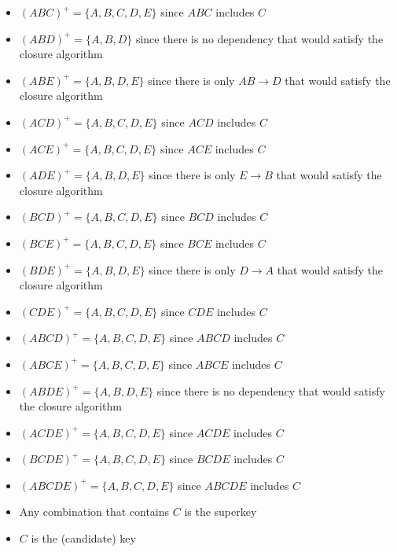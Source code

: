 \documentclass[12pt]{article}
\begin{document}
\begin{enumerate}
\begin{itemize}
          \item $(ABC)^+ = \{A, B, C, D, E\}$ since $ABC$ includes $C$
          \item $(ABD)^+ = \{A, B, D\}$ since there is no dependency that would
                satisfy the closure algorithm
          \item $(ABE)^+ = \{A, B, D, E\}$ since there is only $AB
                \longrightarrow D$ that would satisfy the closure algorithm
          \item $(ACD)^+ = \{A, B, C, D, E\}$ since $ACD$ includes $C$
          \item $(ACE)^+ = \{A, B, C, D, E\}$ since $ACE$ includes $C$
          \item $(ADE)^+ = \{A, B, D, E\}$ since there is only $E
                \longrightarrow B$ that would satisfy the closure algorithm
          \item $(BCD)^+ = \{A, B, C, D, E\}$ since $BCD$ includes $C$
          \item $(BCE)^+ = \{A, B, C, D, E\}$ since $BCE$ includes $C$
          \item $(BDE)^+ = \{A, B, D, E\}$ since there is only $D
                \longrightarrow A$ that would satisfy the closure algorithm
          \item $(CDE)^+ = \{A, B, C, D, E\}$ since $CDE$ includes $C$
          \item $(ABCD)^+ = \{A, B, C, D, E\}$ since $ABCD$ includes $C$
          \item $(ABCE)^+ = \{A, B, C, D, E\}$ since $ABCE$ includes $C$
          \item $(ABDE)^+ = \{A, B, D, E\}$ since there is no dependency that
                would satisfy the closure algorithm
          \item $(ACDE)^+ = \{A, B, C, D, E\}$ since $ACDE$ includes $C$
          \item $(BCDE)^+ = \{A, B, C, D, E\}$ since $BCDE$ includes $C$
          \item $(ABCDE)^+ = \{A, B, C, D, E\}$ since $ABCDE$ includes $C$

          \item Any combination that contains $C$ is the superkey
          \item $C$ is the (candidate) key
        \end{itemize}
  \ \\


\end{enumerate}
\end{document}
